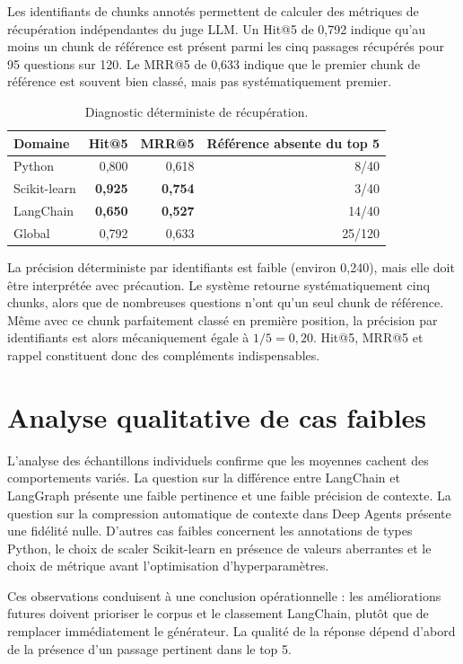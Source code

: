 \documentclass[12pt,a4paper,oneside]{report}
\begin{document}
Les identifiants de chunks annotés permettent de calculer des métriques de
récupération indépendantes du juge LLM. Un Hit@5 de 0,792 indique qu'au moins
un chunk de référence est présent parmi les cinq passages récupérés pour 95
questions sur 120. Le MRR@5 de 0,633 indique que le premier chunk de référence
est souvent bien classé, mais pas systématiquement premier.

\begin{table}[H]
\centering
\caption{Diagnostic déterministe de récupération.}
\label{tab:retrievaldiag}
\begin{tabular}{lrrr}
\toprule
\textbf{Domaine} & \textbf{Hit@5} & \textbf{MRR@5} & \textbf{Référence absente du top 5}\\
\midrule
Python & 0,800 & 0,618 & 8/40\\
Scikit-learn & \textbf{0,925} & \textbf{0,754} & 3/40\\
LangChain & \textbf{0,650} & \textbf{0,527} & 14/40\\
\midrule
Global & 0,792 & 0,633 & 25/120\\
\bottomrule
\end{tabular}
\end{table}

La précision déterministe par identifiants est faible (environ 0,240), mais elle
doit être interprétée avec précaution. Le système retourne systématiquement cinq
chunks, alors que de nombreuses questions n'ont qu'un seul chunk de référence.
Même avec ce chunk parfaitement classé en première position, la précision par
identifiants est alors mécaniquement égale à $1/5=0{,}20$. Hit@5, MRR@5 et
rappel constituent donc des compléments indispensables.

\section{Analyse qualitative de cas faibles}

L'analyse des échantillons individuels confirme que les moyennes cachent des
comportements variés. La question sur la différence entre LangChain et LangGraph
présente une faible pertinence et une faible précision de contexte. La question
sur la compression automatique de contexte dans Deep Agents présente une
fidélité nulle. D'autres cas faibles concernent les annotations de types Python,
le choix de scaler Scikit-learn en présence de valeurs aberrantes et le choix de
métrique avant l'optimisation d'hyperparamètres.

Ces observations conduisent à une conclusion opérationnelle : les améliorations
futures doivent prioriser le corpus et le classement LangChain, plutôt que de
remplacer immédiatement le générateur. La qualité de la réponse dépend d'abord
de la présence d'un passage pertinent dans le top 5.
\end{document}
